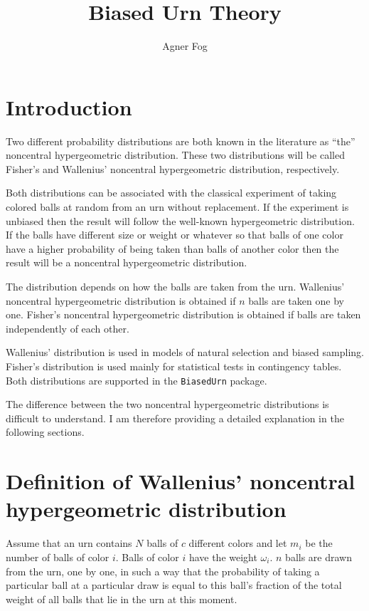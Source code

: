 \documentclass[a4paper]{article}
\begin{document}
\title{Biased Urn Theory}
\author{Agner Fog}

\maketitle

\section{Introduction}
%
Two different probability distributions are both known in the
literature as ``the'' noncentral hypergeometric distribution. These
two distributions will be called Fisher's and Wallenius' noncentral
hypergeometric distribution, respectively. 

Both distributions can be associated with the classical experiment 
of taking colored balls at random from an urn without replacement. 
If the experiment is unbiased then the result will follow the well-known
hypergeometric distribution. If the balls have different size or weight
or whatever so that balls of one color have a higher probability of being
taken than balls of another color then the result will be a
noncentral hypergeometric distribution.

The distribution depends on how the balls are taken from the urn. 
Wallenius' noncentral hypergeometric distribution is obtained if $n$ 
balls are taken one by one. Fisher's noncentral hypergeometric 
distribution is obtained if balls are taken independently of each other.

Wallenius' distribution is used in models of natural selection and biased
sampling. Fisher's distribution is used mainly for statistical tests in
contingency tables. Both distributions are supported in the {\tt BiasedUrn}
package.

The difference between the two noncentral hypergeometric distributions 
is difficult to understand. I am therefore providing a detailed
explanation in the following sections.


\section{Definition of Wallenius' noncentral hypergeometric distribution}
%
Assume that an urn contains $N$ balls of $c$ different colors and let
$m_i$ be the number of balls of color $i$. Balls of color $i$ have the
weight $\omega_i$. $n$ balls are drawn from the urn, one by one, in 
such a way that the probability of taking a particular ball at a 
particular draw is equal to this ball's fraction of the total weight of
all balls that lie in the urn at this moment.
\end{document}
